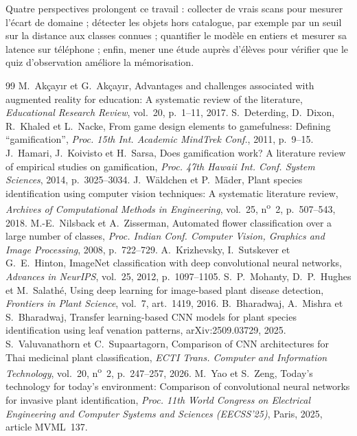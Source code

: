 \documentclass[conference]{IEEEtran}
\begin{document}
Quatre perspectives prolongent ce travail : collecter de vrais scans pour mesurer l'écart de domaine ; détecter les objets hors catalogue, par exemple par un seuil sur la distance aux classes connues ; quantifier le modèle en entiers et mesurer sa latence sur téléphone ; enfin, mener une étude auprès d'élèves pour vérifier que le quiz d'observation améliore la mémorisation.

\begin{thebibliography}{99}
 M.~Akçayır et G.~Akçayır, \og Advantages and challenges associated with augmented reality for education: A systematic review of the literature\fg{}, \emph{Educational Research Review}, vol.~20, p.~1--11, 2017.
 S.~Deterding, D.~Dixon, R.~Khaled et L.~Nacke, \og From game design elements to gamefulness: Defining ``gamification''\fg{}, \emph{Proc. 15th Int. Academic MindTrek Conf.}, 2011, p.~9--15.
 J.~Hamari, J.~Koivisto et H.~Sarsa, \og Does gamification work? A literature review of empirical studies on gamification\fg{}, \emph{Proc. 47th Hawaii Int. Conf. System Sciences}, 2014, p.~3025--3034.
 J.~Wäldchen et P.~Mäder, \og Plant species identification using computer vision techniques: A systematic literature review\fg{}, \emph{Archives of Computational Methods in Engineering}, vol.~25, n\textsuperscript{o}~2, p.~507--543, 2018.
 M.-E.~Nilsback et A.~Zisserman, \og Automated flower classification over a large number of classes\fg{}, \emph{Proc. Indian Conf. Computer Vision, Graphics and Image Processing}, 2008, p.~722--729.
 A.~Krizhevsky, I.~Sutskever et G.~E.~Hinton, \og ImageNet classification with deep convolutional neural networks\fg{}, \emph{Advances in NeurIPS}, vol.~25, 2012, p.~1097--1105.
 S.~P.~Mohanty, D.~P.~Hughes et M.~Salathé, \og Using deep learning for image-based plant disease detection\fg{}, \emph{Frontiers in Plant Science}, vol.~7, art.~1419, 2016.
 B.~Bharadwaj, A.~Mishra et S.~Bharadwaj, \og Transfer learning-based CNN models for plant species identification using leaf venation patterns\fg{}, arXiv:2509.03729, 2025.
 S.~Valuvanathorn et C.~Supaartagorn, \og Comparison of CNN architectures for Thai medicinal plant classification\fg{}, \emph{ECTI Trans. Computer and Information Technology}, vol.~20, n\textsuperscript{o}~2, p.~247--257, 2026.
 M.~Yao et S.~Zeng, \og Today's technology for today's environment: Comparison of convolutional neural networks for invasive plant identification\fg{}, \emph{Proc. 11th World Congress on Electrical Engineering and Computer Systems and Sciences (EECSS'25)}, Paris, 2025, article MVML~137.

\end{thebibliography}
\end{document}
